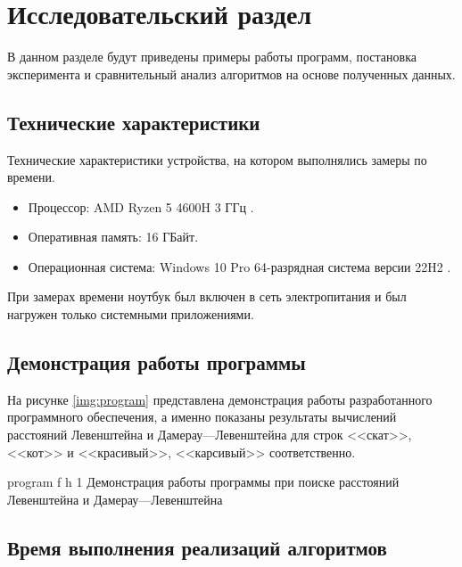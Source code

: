 \chapter{Исследовательский раздел}

В данном разделе будут приведены примеры работы программ, постановка эксперимента и сравнительный анализ алгоритмов на основе полученных данных.


\section{Технические характеристики}

Технические характеристики устройства, на котором выполнялись замеры по времени.

\begin{itemize}
	\item Процессор: AMD Ryzen 5 4600H 3 ГГц \cite{amd}.
	\item Оперативная память: 16 ГБайт.
	\item Операционная система: Windows 10 Pro 64-разрядная система версии 22H2 \cite{windows}.
\end{itemize}

При замерах времени ноутбук был включен в сеть электропитания и был нагружен только системными приложениями.


\section{Демонстрация работы программы}

На рисунке \ref{img:program} представлена демонстрация работы разработанного программного обеспечения, а именно показаны результаты вычислений расстояний Левенштейна и Дамерау---Левенштейна для строк <<скат>>, <<кот>> и <<красивый>>, <<карсивый>> соответственно.  
\clearpage

{program} %
{f} %
{h} %
{1\textwidth} %
{Демонстрация работы программы при поиске расстояний Левенштейна и Дамерау---Левенштейна} %

\clearpage

\section{Время выполнения реализаций алгоритмов}


